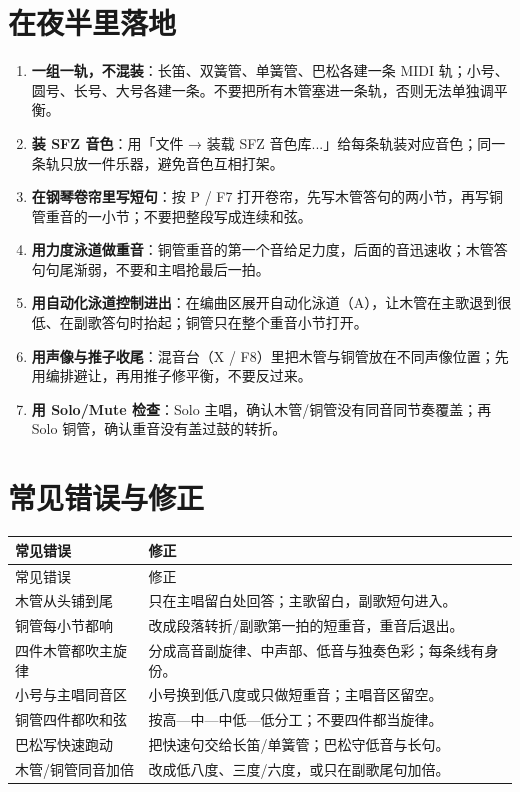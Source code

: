 \section{在夜半里落地}
\label{sec:winds-yeban}

\begin{enumerate}
\item \textbf{一组一轨，不混装}：长笛、双簧管、单簧管、巴松各建一条 MIDI 轨；小号、圆号、长号、大号各建一条。不要把所有木管塞进一条轨，否则无法单独调平衡。
\item \textbf{装 SFZ 音色}：用「文件 → 装载 SFZ 音色库...」给每条轨装对应音色；同一条轨只放一件乐器，避免音色互相打架。
\item \textbf{在钢琴卷帘里写短句}：按 P / F7 打开卷帘，先写木管答句的两小节，再写铜管重音的一小节；不要把整段写成连续和弦。
\item \textbf{用力度泳道做重音}：铜管重音的第一个音给足力度，后面的音迅速收；木管答句句尾渐弱，不要和主唱抢最后一拍。
\item \textbf{用自动化泳道控制进出}：在编曲区展开自动化泳道（A），让木管在主歌退到很低、在副歌答句时抬起；铜管只在整个重音小节打开。
\item \textbf{用声像与推子收尾}：混音台（X / F8）里把木管与铜管放在不同声像位置；先用编排避让，再用推子修平衡，不要反过来。
\item \textbf{用 Solo/Mute 检查}：Solo 主唱，确认木管/铜管没有同音同节奏覆盖；再 Solo 铜管，确认重音没有盖过鼓的转折。
\end{enumerate}


\section{常见错误与修正}
\label{sec:winds-mistakes}

\begin{longtable}{p{}p{}}
\toprule
常见错误 & 修正 \\
\midrule
\endfirsthead
\toprule
常见错误 & 修正 \\
\midrule
\endhead
木管从头铺到尾 & 只在主唱留白处回答；主歌留白，副歌短句进入。 \\
铜管每小节都响 & 改成段落转折/副歌第一拍的短重音，重音后退出。 \\
四件木管都吹主旋律 & 分成高音副旋律、中声部、低音与独奏色彩；每条线有身份。 \\
小号与主唱同音区 & 小号换到低八度或只做短重音；主唱音区留空。 \\
铜管四件都吹和弦 & 按高—中—中低—低分工；不要四件都当旋律。 \\
巴松写快速跑动 & 把快速句交给长笛/单簧管；巴松守低音与长句。 \\
木管/铜管同音加倍 & 改成低八度、三度/六度，或只在副歌尾句加倍。 \\
\bottomrule
\end{longtable}

